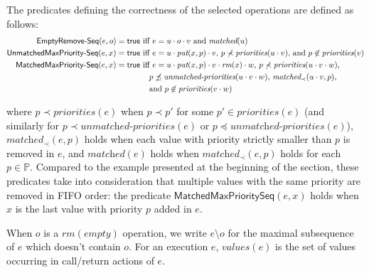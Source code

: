 The predicates defining the correctness of the selected operations are defined as follows:
{\small
\begin{align*}
\mathsf{EmptyRemove\text{-}Seq}(e,o)=\mathsf{true} & \mbox{ iff  $e= u\cdot o\cdot v$ and $\textit{matched}(u)$} \\
\mathsf{UnmatchedMaxPriority\text{-}Seq}(e,x)=\mathsf{true} & \mbox{ iff  $e= u\cdot \textit{put}(x,p)\cdot v$, $p\not\prec \textit{priorities}(u\cdot v)$, and $p\not\in \textit{priorities}(v)$} \\
\mathsf{MatchedMaxPriority\text{-}Seq}(e,x)=\mathsf{true} & \mbox{ iff  $e= u\cdot \textit{put}(x,p)\cdot v\cdot \textit{rm}(x)\cdot w$, $p\not\prec \textit{priorities}(u\cdot v\cdot w)$,} \\
&\hspace{4mm}\mbox{$p\not\preceq \textit{unmatched-priorities}(u\cdot v\cdot w)$, $\textit{matched}_\prec(u\cdot v,p)$,} \\
&\hspace{4mm}\mbox{and $p\not\in \textit{priorities}(v\cdot w)$}
\end{align*}
}

\vspace{-3mm}
\noindent
where $p\prec \textit{priorities}(e)$ when $p\prec p'$ for some $p'\in \textit{priorities}(e)$ (and similarly for $p\prec \textit{unmatched-priorities}(e)$ or $p\preceq \textit{unmatched-priorities}(e)$),
$\textit{matched}_\prec(e,p)$ holds when each value with priority strictly smaller than $p$ is removed in $e$, and $\textit{matched}(e)$ holds when $\textit{matched}_\prec(e,p)$ holds for each $p\in\mathbb{P}$. Compared to the example presented at the beginning of the section, these predicates take into consideration that multiple values with the same priority are removed in FIFO order: the predicate $\mathsf{MatchedMaxPrioritySeq}(e,x)$ holds when $x$ is the last value with priority $p$ added in $e$.

When $o$ is a $\textit{rm}(\textit{empty})$ operation, we write $e\setminus o$ for the maximal subsequence of $e$ which doesn't contain $o$. For an execution $e$, $\textit{values}(e)$ is the set of values occurring in call/return actions of $e$.


